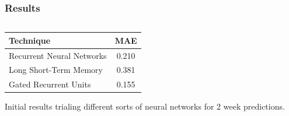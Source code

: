 \documentclass[aspectratio=169]{beamer}
\begin{document}
  \begin{frame}
    \frametitle{Results}
    \begin{columns}
      \begin{column}{0.5\textwidth}

        \begin{table}[h]
        \begin{tabular}{lc}
          \hline
          Technique & MAE\\ \hline
          Recurrent Neural Networks       & 0.210     \\ %
          Long Short-Term Memory     & 0.381     \\ %
          Gated Recurrent Units       & 0.155     \\ \hline %
          \end{tabular}
          \label{tab:results}
        \end{table}
        Initial results trialing different sorts of neural networks for 2 week predictions.


\end{column}
\end{columns}
\end{frame}
\end{document}
